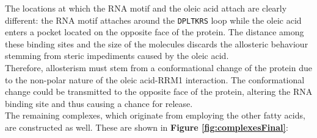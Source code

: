 The locations at which the RNA motif and the oleic acid attach are clearly different: the RNA motif attaches around the \texttt{DPLTKRS} loop while the oleic acid enters a pocket located on the opposite face of the protein. The distance among these binding sites and the size of the molecules discards the allosteric behaviour stemming from steric impediments caused by the oleic acid.\\

Therefore, allosterism must stem from a conformational change of the protein due to the non-polar nature of the oleic acid-RRM1 interaction. The conformational change could be transmitted to the opposite face of the protein, altering the RNA binding site and thus causing a chance for release.\\

The remaining complexes, which originate from employing the other fatty acids, are constructed as well. These are shown in \textbf{Figure \ref{fig:complexesFinal}}:\pagebreak

